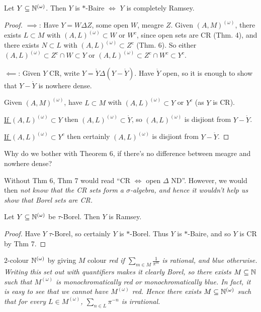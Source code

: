 \documentclass[10pt]{article}
\newcommand{\bom}{{(\omega)}}
\begin{document}
\begin{theorem}
    Let $Y\subset \N^\bom$. Then $Y$ is $\ast$-Baire $\iff$ $Y$ is completely Ramsey.
\end{theorem}
\begin{proof}
    \underline{$\implies$}: Have $Y = W\Delta Z$, some open $W$, meagre $Z$. Given $(A,M)^\bom$, there exists $L \subset M$ with $(A,L)^\bom \subset W$ or $W^c$, since open sets are CR (Thm. 4), and there exists $N\subset L$ with $(A,L)^\bom \subset Z^c$ (Thm. 6). So either $(A,L)^\bom \subset Z^c\cap W\subset Y$ or $(A,L)^\bom \subset Z^c \cap W^c \subset Y^c$.

    \underline{$\impliedby$}: Given $Y$ CR, write $Y = \mathring{Y} \Delta (Y - \mathring{Y})$. Have $\mathring{Y}$ open, so it is enough to show that $Y - \mathring{Y}$ is nowhere dense.

    Given $(A,M)^\bom$, have $L \subset M$ with $(A,L)^\bom \subset Y$ or $Y^c$ (as $Y$ is CR).
    
    \underline{If $(A,L)^\bom \subset Y$} then $(A,L)^\bom \subset \mathring{Y}$, so $(A,L)^\bom$ is disjiont from $Y - \mathring{Y}$.

    \underline{If $(A,L)^\bom \subset Y^c$} then certainly $(A,L)^\bom$ is disjiont from $Y - \mathring{Y}$.
\end{proof}

\begin{remark*}
    Why do we bother with Theorem 6, if there's no difference between meagre and nowhere dense?

    Without Thm 6, Thm 7 would read ``CR $\iff$ open $\Delta$ ND''. However, we would then \it{not} know that the CR sets form a $\sigma$-algebra, and hence it wouldn't help us show that Borel sets are CR.
\end{remark*}

\begin{cor}
    Let $Y \subset \N^\bom$ be $\tau$-Borel. Then $Y$ is Ramsey.
\end{cor}
\begin{proof}
    Have $Y$ $\tau$-Borel, so certainly $Y$ is $\ast$-Borel. Thus $Y$ is $\ast$-Baire, and so $Y$ is CR by Thm 7.
\end{proof}

\begin{remark*}
    $2$-colour $\N^\bom$ by giving $M$ colour \it{red} if $\sum_{m\in M} \frac{1}{\pi^m}$ is rational, and blue otherwise. Writing this set out with quantifiers makes it clearly Borel, so there exists $M\subseteq \mathbb{N}$ such that $M^\bom$ is monochromatically red or monochromatically blue. In fact, it is easy to see that we cannot have $M^\bom$ red. Hence there exists $M\subset \N^\bom$ such that for every $L \in M^\bom$, $\sum_{n\in L}\pi^{-n}$ is irrational.
\end{remark*}
\end{document}
